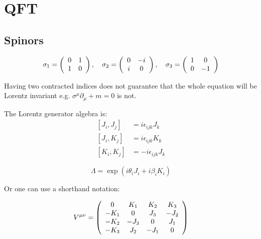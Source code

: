 \chapter{QFT}

\section{Spinors}

\begin{equation}
    \sigma _ { 1 } = \left( \begin{array} { c c } { 0 } & { 1 } \\ { 1 } & { 0 } \end{array} \right) , \quad \sigma _ { 2 } = \left( \begin{array} { c c } { 0 } & { - i } \\ { i } & { 0 } \end{array} \right) , \quad \sigma _ { 3 } = \left( \begin{array} { c c } { 1 } & { 0 } \\ { 0 } & { - 1 } \end{array} \right)
\end{equation}

Having two contracted indices does not guarantee that the whole equation will be Lorentz invariant e.g. $\sigma^\mu \partial_\mu+m = 0 $ is not.

The Lorentz generator algebra is:
\begin{equation}
    \left.\begin{aligned} \left[ J _ { i } , J _ { j } \right] & = i \epsilon _ { i j k } J _ { k } \\ \left[ J _ { i } , K _ { j } \right] & = i \epsilon _ { i j k } K _ { k } \\ \left[ K _ { i } , K _ { j } \right] & = - i \epsilon _ { i j k } J _ { k } \end{aligned} \right.
\end{equation}


\begin{equation}
    \Lambda = \exp \left( i \theta _ { i } J _ { i } + i \beta _ { i } K _ { i } \right)
\end{equation}

Or one can use a shorthand notation:

\begin{equation}
    V ^ { \mu \nu } = \left( \begin{array} { c c c c } { 0 } & { K _ { 1 } } & { K _ { 2 } } & { K _ { 3 } } \\ { - K _ { 1 } } & { 0 } & { J _ { 3 } } & { - J _ { 2 } } \\ { - K _ { 2 } } & { - J _ { 3 } } & { 0 } & { J _ { 1 } } \\ { - K _ { 3 } } & { J _ { 2 } } & { - J _ { 1 } } & { 0 } \end{array} \right)
\end{equation}

